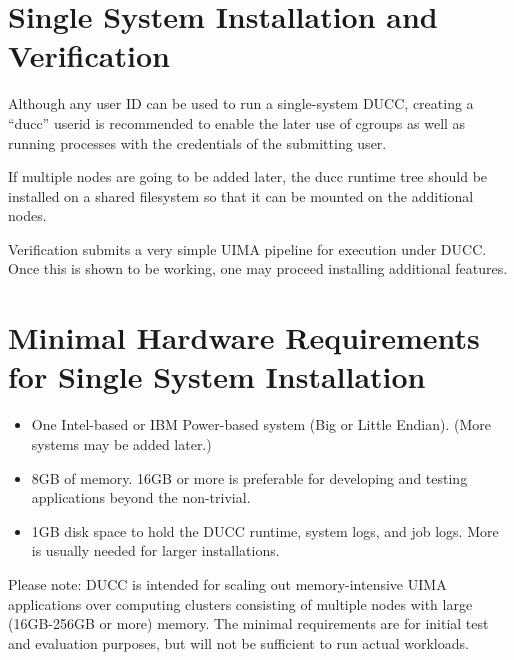 \section{Single System Installation and Verification}

Although any user ID can be used to run a single-system DUCC, creating a ``ducc'' userid is recommended
to enable the later use of cgroups as well as running processes with the credentials of the submitting user.

If multiple nodes are going to be added later, the ducc runtime tree should be installed
on a shared filesystem so that it can be mounted on the additional nodes.

Verification submits a very simple UIMA pipeline for execution under DUCC.  Once this is shown to be
working, one may proceed installing additional features.


\section{Minimal Hardware Requirements for Single System Installation}
\begin{itemize}
    \item One Intel-based or IBM Power-based system (Big or Little Endian).  (More systems may be added later.)

    \item 8GB of memory.  16GB or more is preferable for developing and testing applications beyond
      the non-trivial.  

    \item 1GB disk space to hold the DUCC runtime, system logs, and job logs.  More is
      usually needed for larger installations.  
\end{itemize}

Please note: DUCC is intended for scaling out memory-intensive UIMA applications over computing
clusters consisting of multiple nodes with large (16GB-256GB or more) memory.  The minimal
requirements are for initial test and evaluation purposes, but will not be sufficient to run actual
workloads.

